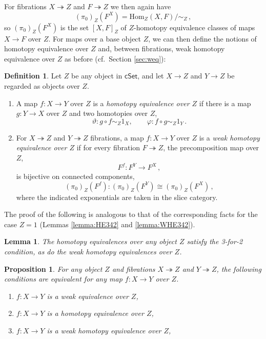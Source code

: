 \documentclass[11pt,reqno]{amsart}
\newcommand{\cSet}{\ensuremath{\mathsf{cSet}}}
\newcommand{\ra}{\ensuremath{\rightarrow}}
\newcommand{\fib}{\ensuremath{\twoheadrightarrow}}
\renewcommand{\to}{\ensuremath{\rightarrow}}
\renewcommand{\hom}{\ensuremath{\mathrm{Hom}}}
\newtheorem{proposition}[theorem]{Proposition}
\newtheorem{lemma}[theorem]{Lemma}
\theoremstyle{remark}
\theoremstyle{definition}
\newtheorem{definition}[theorem]{Definition}
\begin{document}
For fibrations $X\fib Z$ and $F\fib Z$ we then again have 
\[
(\pi_0)_Z(F^X) = \hom_{Z}(X,F)/\!\!\sim_Z\,,
\]  
so $(\pi_0)_Z(F^X)$ is the set  $[X, F]_Z$ of $Z$-homotopy equivalence classes of maps $X\ra F$ over $Z$.
For maps over a base object $Z$, we can then define the notions of homotopy equivalence over $Z$ and, between fibrations, weak homotopy equivalence over $Z$ as before (cf.~Section \ref{sec:weq}):

\begin{definition}\label{def:slicedhewe}
Let $Z$ be any object in $\cSet$, and let $X \to Z$ and $Y \to Z$ be regarded as objects over $Z$.
%
\begin{enumerate}
%
\item A map $f : X\to Y$ over $Z$ is a \emph{homotopy equivalence over $Z$} 
if there is a map $g : Y\to X$ over $Z$ and two homotopies over $Z$,
\[
\vartheta : g\circ f \sim_Z 1_X,\qquad \varphi : f\circ g \sim_Z 1_Y\,.
\]
%
\item For $X\fib Z$ and $Y\fib Z$ fibrations, a map $f : X\to Y$ over $Z$ is a \emph{weak homotopy equivalence over $Z$} if for every fibration $F\fib Z$, the precomposition map over $Z$,
\[
F^f : F^Y \to F^X\,,
\]
is bijective on connected components, 
\[
(\pi_0)_Z(F^f) : (\pi_0)_Z(F^Y) \cong (\pi_0)_Z(F^X)\,,
\]
where the indicated exponentials are taken in the slice category. 
\end{enumerate}
\end{definition} 

The proof of the following is analogous to that of the corresponding facts for the case $Z=1$ (Lemmas \ref{lemma:HE342} and \ref{lemma:WHE342}).

\begin{lemma}\label{lemma:HE342sliced}
The  homotopy equivalences over any object $Z$ satisfy the 3-for-2 condition, as do the weak homotopy equivalences over $Z$.
\end{lemma}

\begin{proposition}\label{prop:weqisheoverZ}
For any object $Z$ and fibrations $X\fib Z$ and $Y\fib Z$, the following conditions are equivalent for any map $f : X\to Y$ over $Z$.
\begin{enumerate}
\item $f : X\to Y$ is a weak equivalence over $Z$,
\item $f : X\to Y$ is a homotopy equivalence over $Z$, 
\item $f : X\to Y$ is a weak homotopy equivalence over $Z$, 
 \end{enumerate}
\end{proposition}
\end{document}
